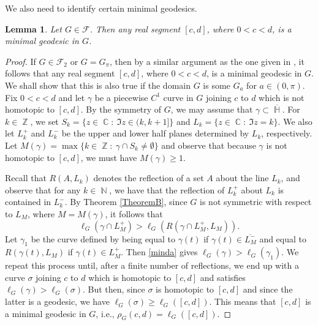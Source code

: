 \documentclass[11pt, letterpaper,leqno]{amsart}
\numberwithin{equation}{section}
\newtheorem{lemma}{Lemma}[section]
\theoremstyle{definition}
\DeclareMathOperator{\N}{\mathbb{N}}
\DeclareMathOperator{\C}{\mathbb{C}}
\DeclareMathOperator{\Ha}{\mathbb{H}}
\DeclareMathOperator{\Z}{\mathbb{Z}}
\begin{document}
We also need to identify certain minimal geodesics. 
\begin{lemma}\label{L4}
Let $G\in \mathcal{F}$. Then any real segment $[c,d]$, where $0<c<d$, is a minimal geodesic in $G$. 
\end{lemma}
\begin{proof}
If $G\in\mathcal{F}_2$ or $G=G_\pi$, then by a similar argument as the one given in \cite[Lemma 4.4]{CZ}, it follows that any real segment $[c,d]$, where $0<c<d$, is a minimal geodesic in $G$. We shall show that this is also true if the domain $G$ is some $G_a$ for $a\in (0,\pi)$. Fix $0<c<d$ and let $\gamma$ be a piecewise $C^1$ curve in $G$ joining $c$ to $d$ which is not homotopic to $[c,d]$. By the symmetry of $G$, we may assume that $\gamma \subset\overline{\Ha}$. For $k\in\Z$, we set $S_k=\{z\in\C:\ \Im z\in (k,k+1]\}$ and $L_k=\{z\in\C:\ \Im z=k\}$. We also let $L_k^{+}$ and $L_k^{-}$ be the upper and lower half planes determined by $L_k$, respectively. Let $M(\gamma)=\max\{k\in\Z:\ \gamma\cap S_k\neq \emptyset\}$ and observe that because $\gamma$ is not homotopic to $[c,d]$, we must have $M(\gamma)\geq 1$. 

Recall that $R(A,L_k)$ denotes the reflection of a set $A$ about the line $L_k$, and observe that for any $k\in\N$, we have that the reflection of $L_k^{+}$ about $L_k$ is contained in $L_k^{-}$. By Theorem \ref{TheoremB}, since $G$ is not symmetric with respect to $L_{M}$, where $M=M(\gamma)$, it follows that
\begin{equation}\label{minda}
	\ell_G\left(\gamma\cap L_M^{+}\right)>\ell_G\left(R(\gamma\cap L_M^{+},L_M)\right). 
\end{equation}
Let $\gamma_1$ be the curve defined by being equal to $\gamma(t)$ if $\gamma(t)\in \overline{L_M^{-}}$ and equal to $R(\gamma(t), L_M)$ if $\gamma(t)\in L_M^{+}$. Then \eqref{minda} gives $\ell_G(\gamma)>\ell_G(\gamma_1)$. We repeat this process until, after a finite number of reflections, we end up with a curve $\sigma$ joining $c$ to $d$ which is homotopic to $[c,d]$ and satisfies $\ell_G(\gamma)>\ell_G(\sigma)$. But then, since $\sigma$ is homotopic to $[c,d]$ and since the latter is a geodesic, we have $\ell_G(\sigma)\geq\ell_G([c,d])$. This means that $[c,d]$ is a minimal geodesic in $G$, i.e., $\rho_G(c,d)=\ell_G([c,d])$.
\end{proof}
\end{document}
